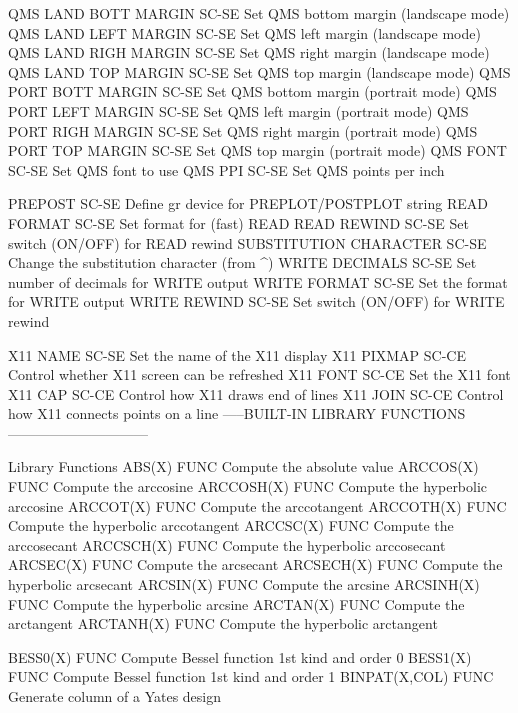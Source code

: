 QMS LAND BOTT MARGIN        SC-SE Set QMS bottom margin (landscape mode)
QMS LAND LEFT MARGIN        SC-SE Set QMS left margin (landscape mode)
QMS LAND RIGH MARGIN        SC-SE Set QMS right margin (landscape mode)
QMS LAND TOP  MARGIN        SC-SE Set QMS top margin (landscape mode)
QMS PORT BOTT MARGIN        SC-SE Set QMS bottom margin (portrait mode)
QMS PORT LEFT MARGIN        SC-SE Set QMS left margin (portrait mode)
QMS PORT RIGH MARGIN        SC-SE Set QMS right margin (portrait mode)
QMS PORT TOP  MARGIN        SC-SE Set QMS top margin (portrait mode)
QMS FONT                    SC-SE Set QMS font to use
QMS PPI                     SC-SE Set QMS points per inch

PREPOST                     SC-SE Define gr device for PREPLOT/POSTPLOT string
READ FORMAT                 SC-SE Set format for (fast) READ
READ REWIND                 SC-SE Set switch (ON/OFF) for READ rewind
SUBSTITUTION CHARACTER      SC-SE Change the substitution character (from ^)
WRITE DECIMALS              SC-SE Set number of decimals for WRITE output
WRITE FORMAT                SC-SE Set the format for WRITE output
WRITE REWIND                SC-SE Set switch (ON/OFF) for WRITE rewind

X11 NAME                    SC-SE Set the name of the X11 display 
X11 PIXMAP                  SC-CE Control whether X11 screen can be refreshed
X11 FONT                    SC-CE Set the X11 font
X11 CAP                     SC-CE Control how X11 draws end of lines
X11 JOIN                    SC-CE Control how X11 connects points on a line
-----BUILT-IN LIBRARY FUNCTIONS------------------------------

Library Functions
ABS(X)                      FUNC  Compute the absolute value
ARCCOS(X)                   FUNC  Compute the arccosine
ARCCOSH(X)                  FUNC  Compute the hyperbolic arccosine
ARCCOT(X)                   FUNC  Compute the arccotangent
ARCCOTH(X)                  FUNC  Compute the hyperbolic arccotangent
ARCCSC(X)                   FUNC  Compute the arccosecant
ARCCSCH(X)                  FUNC  Compute the hyperbolic arccosecant
ARCSEC(X)                   FUNC  Compute the arcsecant
ARCSECH(X)                  FUNC  Compute the hyperbolic arcsecant
ARCSIN(X)                   FUNC  Compute the arcsine
ARCSINH(X)                  FUNC  Compute the hyperbolic arcsine
ARCTAN(X)                   FUNC  Compute the arctangent
ARCTANH(X)                  FUNC  Compute the hyperbolic arctangent

BESS0(X)                    FUNC  Compute Bessel function 1st kind and order 0
BESS1(X)                    FUNC  Compute Bessel function 1st kind and order 1
BINPAT(X,COL)               FUNC  Generate column of a Yates design

